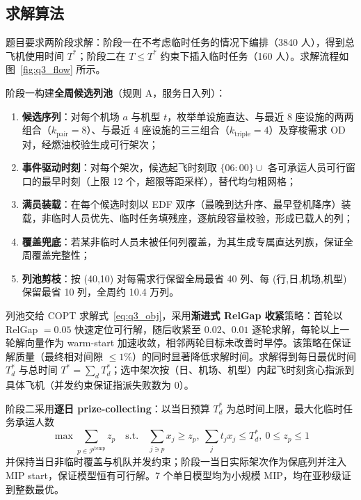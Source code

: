 \documentclass[withoutpreface]{cumcmthesis}
\begin{document}
\subsection{求解算法}

题目要求两阶段求解：阶段一在不考虑临时任务的情况下编排（3840 人），得到总飞机使用时间 $T^*$；阶段二在 $T \leq T^*$ 约束下插入临时任务（160 人）。求解流程如图~\ref{fig:q3_flow} 所示。



阶段一构建\textbf{全周候选列池}（规则 A，服务日入列）：
\begin{enumerate}
\item \textbf{候选序列}：对每个机场 $a$ 与机型 $t$，枚举单设施直达、与最近 8 座设施的两两组合（$k_{\mathrm{pair}}=8$）、与最近 4 座设施的三三组合（$k_{\mathrm{triple}}=4$）及穿梭需求 OD 对，经燃油校验生成可行架次；
\item \textbf{事件驱动时刻}：对每个架次，候选起飞时刻取 $\{06{:}00\} \cup$ 各可承运人员可行窗口的最早时刻（上限 12 个，超限等距采样），替代均匀粗网格；
\item \textbf{满员装载}：在每个候选时刻以 EDF 双序（最晚到达升序、最早登机降序）装载，非临时人员优先、临时任务填残座，逐航段容量校验，形成已载人的列；
\item \textbf{覆盖兜底}：若某非临时人员未被任何列覆盖，为其生成专属直达列族，保证全周覆盖完整性；
\item \textbf{列池剪枝}：按 (40,10) 对每需求行保留全局最省 40 列、每 (行,日,机场,机型) 保留最省 10 列，全周约 10.4 万列。
\end{enumerate}
列池交给 COPT 求解式~\eqref{eq:q3_obj}，采用\textbf{渐进式 RelGap 收紧}策略：首轮以 RelGap $= 0.05$ 快速定位可行解，随后收紧至 $0.02$、$0.01$ 逐轮求解，每轮以上一轮解向量作为 warm-start 加速收敛，相邻两轮目标未改善时早停。该策略在保证解质量（最终相对间隙 $\leq 1\%$）的同时显著降低求解时间。求解得到每日最优时间 $T^*_d$ 与总时间 $T^*=\sum_d T^*_d$；选中架次按（日、机场、机型）内起飞时刻贪心指派到具体飞机（并发约束保证指派失败数为 0）。

阶段二采用\textbf{逐日 prize-collecting}：以当日预算 $T^*_d$ 为总时间上限，最大化临时任务承运人数
\begin{equation}
\max \sum_{p \in \mathcal{P}^{\mathrm{temp}}} z_p \quad \text{s.t.} \quad
\sum_{j \ni p} x_j \geq z_p,\ \sum_j t_j x_j \leq T^*_d,\ 0 \leq z_p \leq 1
\label{eq:q3_prize}
\end{equation}
并保持当日非临时覆盖与机队并发约束；阶段一当日实际架次作为保底列并注入 MIP start，保证模型恒有可行解。7 个单日模型均为小规模 MIP，均在亚秒级证到整数最优。
\end{document}
